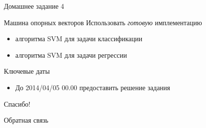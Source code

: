 \documentclass[10pt,a4paper]{beamer}
\begin{document}

\begin{frame}{Домашнее задание 4}

\begin{block}{Машина опорных векторов}
Использовать {\it готовую} имплементацию
\begin{itemize}
\item алгоритма SVM для задачи классификации
\item алгоритма SVM для задачи регрессии
\end{itemize}
\end{block}

\vspace{1em}
Ключевые даты
\begin{itemize}
\item До 2014/04/05 00.00 предоставить решение задания
\end{itemize}

\end{frame}


\begin{frame}{Спасибо!}

\begin{center}
{\Large Обратная связь}
\end{center}

\end{frame}
\end{document}
